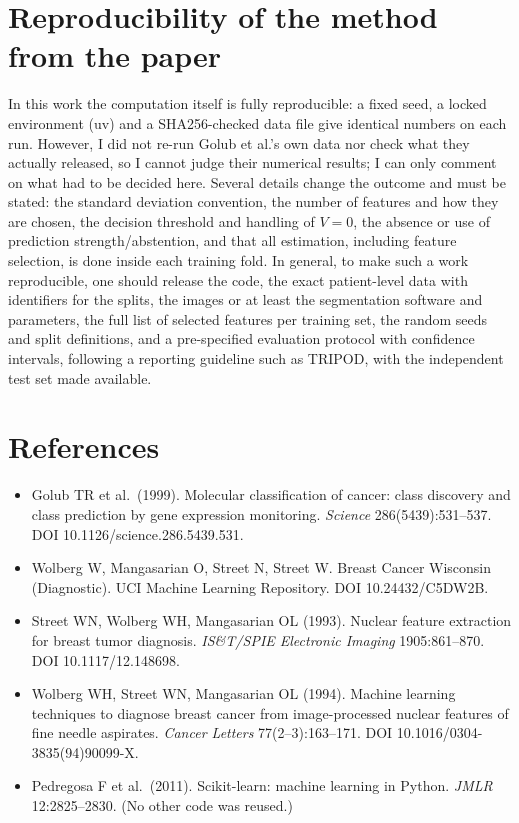 \documentclass[10pt,a4paper]{article}
\begin{document}
\section{Reproducibility of the method from the paper}
In this work the computation itself is fully reproducible: a fixed seed, a locked environment (uv) and a SHA256-checked data file give
identical numbers on each run. However, I did not re-run Golub et al.'s own data nor check what they actually released, so I cannot judge their numerical results; I can
only comment on what had to be decided here. Several details change the outcome and must be stated: the standard deviation
convention, the number of features and how they are chosen, the decision threshold and handling of $V=0$, the absence or use of
prediction strength/abstention, and that all estimation, including feature selection, is done inside each training fold. In general, to make
such a work reproducible, one should release the code, the exact patient-level data with identifiers for the
splits, the images or at least the segmentation software and parameters, the full list of selected features per training set, the
random seeds and split definitions, and a pre-specified evaluation protocol with confidence intervals, following a reporting
guideline such as TRIPOD, with the independent test set made available.

\section*{References}
\small
\begin{itemize}\setlength{\itemsep}{1pt}
\item Golub TR et al.\ (1999). Molecular classification of cancer: class discovery and class prediction by gene expression monitoring. \emph{Science} 286(5439):531--537. DOI 10.1126/science.286.5439.531.
\item Wolberg W, Mangasarian O, Street N, Street W. Breast Cancer Wisconsin (Diagnostic). UCI Machine Learning Repository. DOI 10.24432/C5DW2B.
\item Street WN, Wolberg WH, Mangasarian OL (1993). Nuclear feature extraction for breast tumor diagnosis. \emph{IS\&T/SPIE Electronic Imaging} 1905:861--870. DOI 10.1117/12.148698.
\item Wolberg WH, Street WN, Mangasarian OL (1994). Machine learning techniques to diagnose breast cancer from image-processed nuclear features of fine needle aspirates. \emph{Cancer Letters} 77(2--3):163--171. DOI 10.1016/0304-3835(94)90099-X.
\item Pedregosa F et al.\ (2011). Scikit-learn: machine learning in Python. \emph{JMLR} 12:2825--2830. (No other code was reused.)
\end{itemize}
\normalsize
\end{document}
